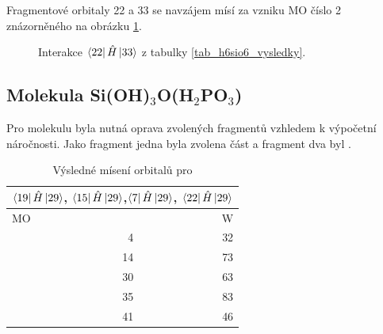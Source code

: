 \documentclass[
  digital, %
  table,   %
  lof,     %
  lot,     %
]{fithesis3}
\begin{document}
  Fragmentové orbitaly  22 a 33 se navzájem mísí za vzniku MO číslo 2 znázorněného na obrázku \ref{obr_h6sio6_vysledky_III}.   
\begin{figure}
\begin{center}
\caption{Interakce $\bra{22}{\hat{H}}\ket{33}$ z tabulky \ref{tab_h6sio6_vysledky}.}

\label{obr_h6sio6_vysledky_III}\end{center}
\end{figure} 
 \subsection{Molekula Si(OH)$_3$O(H$_2$PO$_3$)}
 Pro molekulu  byla nutná oprava zvolených fragmentů vzhledem k výpočetní náročnosti. Jako fragment jedna byla zvolena část  a fragment dva byl .  

\begin{table}[htbp]
\caption{Výsledné mísení orbitalů pro  }
\begin{center}
\begin{tabular}{|r|r|}
\hline
\multicolumn{2}{|c|}{$\bra{19}{\hat{H}}\ket{29}$, $\bra{15}{\hat{H}}\ket{29}$,$\bra{7}{\hat{H}}\ket{29}$, $\bra{22}{\hat{H}}\ket{29}$} \\
\hline \hline
\multicolumn{1}{|l|}{MO} & \multicolumn{1}{r|}{W} \\ \hline
4 & 32 \\ \hline
14 & 73 \\ \hline
30 & 63 \\ \hline
35 & 83 \\ \hline
41 & 46 \\ \hline
\end{tabular}

\label{tab_sio3_vysledky}\end{center}
\end{table}
\end{document}
